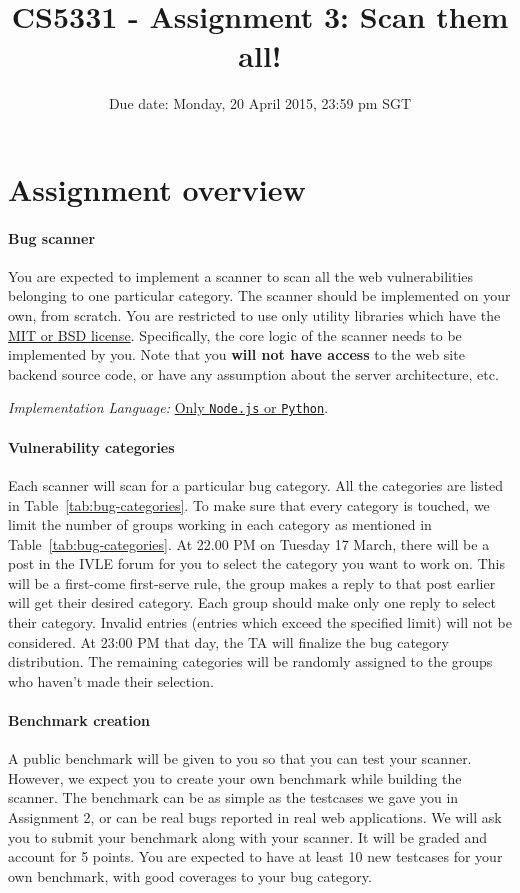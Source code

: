 \documentclass{article}[10pt]
\title{CS5331 - Assignment 3: Scan them all!}
\date{Due date: Monday, 20 April 2015, 23:59 pm SGT}
\begin{document}
\maketitle


\section{Assignment overview}

\paragraph{Bug scanner} You are expected to implement a scanner to scan all the web vulnerabilities belonging to one particular category. The scanner should be implemented on your own, from scratch. You are restricted to use only utility libraries which have the \underline{\href{http://opensource.org/licenses/MIT}{MIT} or \href{http://en.wikipedia.org/wiki/BSD_licenses}{BSD} license}. Specifically, the core logic of the scanner needs to be implemented by you. Note that you {\bf will not have access} to the web site backend source code, or have any assumption about the server architecture, etc.

\textit{Implementation Language:} \underline{Only {\tt Node.js} or {\tt Python}}.

\paragraph{Vulnerability categories} Each scanner will scan for a particular bug category. All the categories are listed in Table~\ref{tab:bug-categories}. To make sure that every category is touched, we limit the number of groups working in each category as mentioned in Table~\ref{tab:bug-categories}. At 22.00 PM on Tuesday 17 March, there will be a post in the IVLE forum for you to select the category you want to work on. This will be a first-come first-serve rule, the group makes a reply to that post earlier will get their desired category. Each group should make only one reply to select their category. Invalid entries (entries which exceed the specified limit) will not be considered. At 23:00 PM that day, the TA will finalize the bug category distribution. The remaining categories will be randomly assigned to the groups who haven't made their selection.

\paragraph{Benchmark creation} A public benchmark will be given to you so that you can test your scanner. However, we expect you to create your own benchmark while building the scanner. The benchmark can be as simple as the testcases we gave you in Assignment 2, or can be real bugs reported in real web applications.
We will ask you to submit your benchmark along with your scanner. It will be graded and account for 5 points. You are expected to have at least 10 new testcases for your own benchmark, with good coverages to your bug category.
\end{document}
